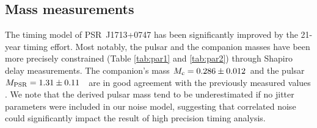 





\subsection{Mass measurements}
\label{sec:mass}
The timing model of PSR~J1713+0747 has been significantly improved by the 21-year timing effort.
Most notably, the pulsar and the companion masses have been more precisely
constrained (Table \ref{tab:par1} and \ref{tab:par2}) through Shapiro delay measurements. The
companion's mass $M_{\rm c} = 0.286\pm0.012$~\Msun and the pulsar $M_{\rm
PSR}=1.31\pm0.11$~\Msun\, are in good agreement with the previously measured values \cite{sns+05}.
We note that the derived pulsar mass tend to be underestimated 
if no jitter parameters were included in our noise model, suggesting that
correlated noise could significantly impact the result of high
precision timing analysis.



